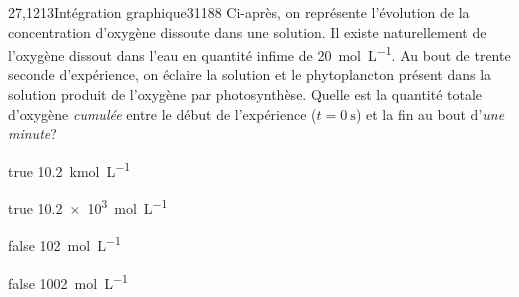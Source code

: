 \documentclass[11pt]{article}
\begin{document}
		\begin{question}{27,1213}{Intégration graphique}{3}{1188}
             Ci-après, on représente l'évolution de la concentration d'oxygène dissoute dans une solution. Il existe naturellement de l'oxygène dissout dans l'eau en quantité infime de \SI{20}{\mol\per\liter}. Au bout de trente seconde d'expérience, on éclaire la solution et le phytoplancton présent dans la solution produit de l'oxygène par photosynthèse. Quelle est la quantité totale d'oxygène \emph{cumulée} entre le début de l'expérience ($t=\SI{0}{\second}$) et la fin au bout d'\emph{une minute}?
            \begin{figure}
             \end{figure}
        \end{question}
        \begin{reponses}
            \item[true] \SI{10.2}{\kilo\mol\per\liter}
		    \item[true] \SI{10.2e3}{\mol\per\liter}
		    \item[false] \SI{102}{\mol\per\liter}
		    \item[false] \SI{1002}{\mol\per\liter}
		    \end{reponses}
        
\end{document}
